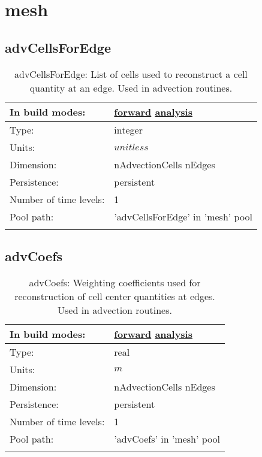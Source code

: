 \section[mesh]{mesh}
\label{sec:var_sec_mesh}
\subsection[advCellsForEdge]{advCellsForEdge}
\label{subsec:var_sec_mesh_advCellsForEdge}
\begin{center}
\begin{longtable}{| p{2.0in} | p{4.0in} |}
        \hline 
        In build modes: & \hyperref[subsec:forward_var_tab_mesh]{forward} \hyperref[subsec:analysis_var_tab_mesh]{analysis} \\
        \hline 
        Type: & integer \\
        \hline 
        Units: & $unitless$ \\
        \hline 
        Dimension: & nAdvectionCells nEdges \\
        \hline 
        Persistence: & persistent \\
        \hline 
        Number of time levels: & 1 \\
        \hline 
            Pool path: & 'advCellsForEdge' in 'mesh' pool
 \\
		 \hline 
    \caption{advCellsForEdge: List of cells used to reconstruct a cell quantity at an edge. Used in advection routines.}
\end{longtable}
\end{center}
\subsection[advCoefs]{advCoefs}
\label{subsec:var_sec_mesh_advCoefs}
\begin{center}
\begin{longtable}{| p{2.0in} | p{4.0in} |}
        \hline 
        In build modes: & \hyperref[subsec:forward_var_tab_mesh]{forward} \hyperref[subsec:analysis_var_tab_mesh]{analysis} \\
        \hline 
        Type: & real \\
        \hline 
        Units: & $m$ \\
        \hline 
        Dimension: & nAdvectionCells nEdges \\
        \hline 
        Persistence: & persistent \\
        \hline 
        Number of time levels: & 1 \\
        \hline 
            Pool path: & 'advCoefs' in 'mesh' pool
 \\
		 \hline 
    \caption{advCoefs: Weighting coefficients used for reconstruction of cell center quantities at edges. Used in advection routines.}
\end{longtable}
\end{center}
